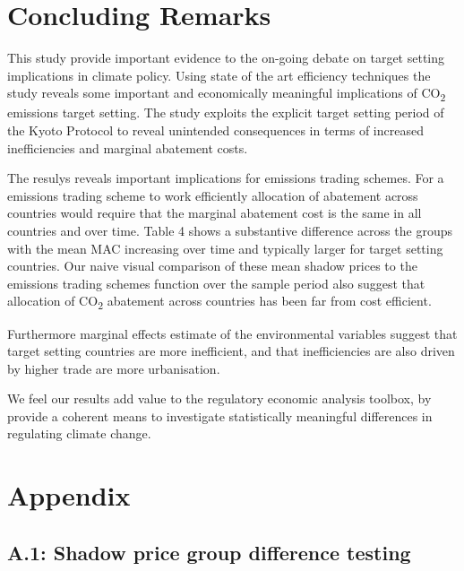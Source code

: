 \documentclass[
  10pt,
]{article}
\begin{document}
\newpage

\hypertarget{concluding-remarks}{%
\section{Concluding Remarks}\label{concluding-remarks}}

This study provide important evidence to the on-going debate on target
setting implications in climate policy. Using state of the art
efficiency techniques the study reveals some important and economically
meaningful implications of CO\textsubscript{2} emissions target setting.
The study exploits the explicit target setting period of the Kyoto
Protocol to reveal unintended consequences in terms of increased
inefficiencies and marginal abatement costs.

The resulys reveals important implications for emissions trading
schemes. For a emissions trading scheme to work efficiently allocation
of abatement across countries would require that the marginal abatement
cost is the same in all countries and over time. Table 4 shows a
substantive difference across the groups with the mean MAC increasing
over time and typically larger for target setting countries. Our naive
visual comparison of these mean shadow prices to the emissions trading
schemes function over the sample period also suggest that allocation of
CO\textsubscript{2} abatement across countries has been far from cost
efficient.

Furthermore marginal effects estimate of the environmental variables
suggest that target setting countries are more inefficient, and that
inefficiencies are also driven by higher trade are more urbanisation.

We feel our results add value to the regulatory economic analysis
toolbox, by provide a coherent means to investigate statistically
meaningful differences in regulating climate change.

\newpage

\hypertarget{appendix}{%
\section{Appendix}\label{appendix}}

\hypertarget{a.1-shadow-price-group-difference-testing}{%
\subsection{A.1: Shadow price group difference
testing}\label{a.1-shadow-price-group-difference-testing}}
\end{document}
